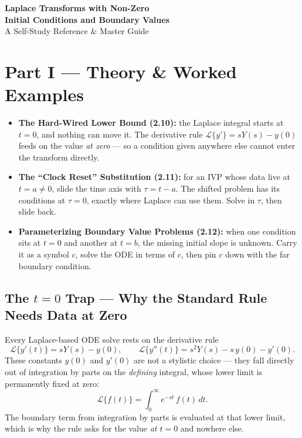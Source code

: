 \documentclass[11pt]{article}
\begin{document}
\begin{center}
    {\Large\bfseries\color{headerblue} Laplace Transforms with Non-Zero\\[2pt] Initial Conditions and Boundary Values}\\[6pt]
    \large A Self-Study Reference \& Master Guide
\end{center}
\vspace{0.4cm}

\tableofcontents
\vspace{0.8cm}

{}
\section*{Part I --- Theory \& Worked Examples}
\setcounter{section}{2}
\setcounter{subsection}{9}

\begin{topicsbox}
\begin{itemize}[leftmargin=*, itemsep=2pt]
  \item \textbf{The Hard-Wired Lower Bound (2.10):} the Laplace integral starts at $t = 0$, and nothing can move it. The derivative rule $\mathcal{L}\{y'\} = sY(s) - y(0)$ feeds on the value \emph{at zero} --- so a condition given anywhere else cannot enter the transform directly.
  \item \textbf{The ``Clock Reset'' Substitution (2.11):} for an IVP whose data live at $t = a \ne 0$, slide the time axis with $\tau = t - a$. The shifted problem has its conditions at $\tau = 0$, exactly where Laplace can use them. Solve in $\tau$, then slide back.
  \item \textbf{Parameterizing Boundary Value Problems (2.12):} when one condition sits at $t = 0$ and another at $t = b$, the missing initial slope is unknown. Carry it as a symbol $c$, solve the ODE in terms of $c$, then pin $c$ down with the far boundary condition.
\end{itemize}
\end{topicsbox}

\subsection{The $t=0$ Trap --- Why the Standard Rule Needs Data at Zero}

Every Laplace-based ODE solve rests on the derivative rule
\[ \mathcal{L}\{y'(t)\} = sY(s) - y(0), \qquad \mathcal{L}\{y''(t)\} = s^2 Y(s) - s\,y(0) - y'(0). \]
These constants $y(0)$ and $y'(0)$ are not a stylistic choice --- they fall directly out of integration by parts on the \emph{defining} integral, whose lower limit is permanently fixed at zero:
\[ \mathcal{L}\{f(t)\} = \int_{0}^{\infty} e^{-st}\, f(t)\, dt. \]
The boundary term from integration by parts is evaluated at that lower limit, which is why the rule asks for the value \emph{at $t = 0$} and nowhere else.
\end{document}
